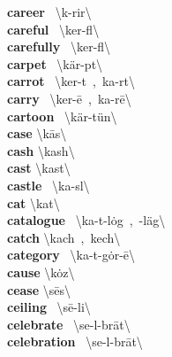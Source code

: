 \documentclass[10pt,a4paper]{article}
\begin{document}
\begin{multicols}{2}
\textbf{ career }\quad \ \textbackslash k\textschwa -\textprimstress rir\textbackslash \\
\textbf{ careful }\quad \ \textbackslash \textprimstress ker-f\textschwa l\textbackslash \\
\textbf{ carefully }\quad \ \textbackslash \textprimstress ker-f\textschwa l\textbackslash \\
\textbf{ carpet }\quad \ \textbackslash \textprimstress k\"{a}r-p\textschwa t\textbackslash \\
\textbf{ carrot }\quad \ \textbackslash \textprimstress ker-\textschwa t\ ,\ \textprimstress ka-r\textschwa t\textbackslash \\
\textbf{ carry }\quad \ \textbackslash \textprimstress ker-\={e}\ ,\ \textprimstress ka-r\={e}\textbackslash \\
\textbf{ cartoon }\quad \ \textbackslash k\"{a}r-\textprimstress t\"{u}n\textbackslash \\
\textbf{ case }\quad \textbackslash \textprimstress k\={a}s\textbackslash \\
\textbf{ cash }\quad \textbackslash \textprimstress kash\textbackslash \\
\textbf{ cast }\quad \textbackslash \textprimstress kast\textbackslash \\
\textbf{ castle }\quad \ \textbackslash \textprimstress ka-s\textschwa l\textbackslash \\
\textbf{ cat }\quad \textbackslash \textprimstress kat\textbackslash \\
\textbf{ catalogue }\quad \ \textbackslash \textprimstress ka-t\textschwa -\textsecstress l\.{o}g\ ,\ -\textsecstress l\"{a}g\textbackslash \\
\textbf{ catch }\quad \textbackslash \textprimstress kach\ ,\ \textprimstress kech\textbackslash \\
\textbf{ category }\quad \ \textbackslash \textprimstress ka-t\textschwa -\textsecstress g\.{o}r-\={e}\textbackslash \\
\textbf{ cause }\quad \textbackslash \textprimstress k\.{o}z\textbackslash \\
\textbf{ cease }\quad \textbackslash \textprimstress s\={e}s\textbackslash \\
\textbf{ ceiling }\quad \ \textbackslash \textprimstress s\={e}-li\engma \textbackslash \\
\textbf{ celebrate }\quad \ \textbackslash \textprimstress se-l\textschwa -\textsecstress br\={a}t\textbackslash \\
\textbf{ celebration }\quad \ \textbackslash \textprimstress se-l\textschwa -\textsecstress br\={a}t\textbackslash \\

\end{multicols}
\end{document}
